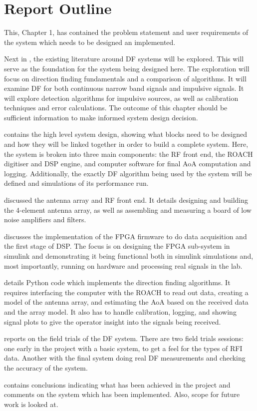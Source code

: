 \section{Report Outline}
This, Chapter 1, has contained the problem statement and user requirements of the system which needs to be designed an implemented. 

Next in , the existing literature around DF systems will be explored. This will serve as the foundation for the system being designed here. The exploration will focus on direction finding fundamentals and a comparison of algorithms. It will examine DF for both continuous narrow band signals and impulsive signals. It will explore detection algorithms for impulsive sources, as well as calibration techniques and error calculations. The outcome of this chapter should be sufficient information to make informed system design decision.

 contains the high level system design, showing what blocks need to be designed and how they will be linked together in order to build a complete system. Here, the system is broken into three main components: the RF front end, the ROACH digitiser and DSP engine, and computer software for final AoA computation and logging. Additionally, the exactly DF algorithm being used by the system will be defined and simulations of its performance run.

 discussed the antenna array and RF front end. It details designing and building the 4-element antenna array, as well as assembling and measuring a board of low noise amplifiers and filters.

 discusses the implementation of the FPGA firmware to do data acquisition and the first stage of DSP. The focus is on designing the FPGA sub-system in simulink and demonstrating it being functional both in simulink simulations and, most importantly, running on hardware and processing real signals in the lab.

 details Python code which implements the direction finding algorithms. It requires interfacing the computer with the ROACH to read out data, creating a model of the antenna array, and estimating the AoA based on the received data and the array model. It also has to handle calibration, logging, and showing signal plots to give the operator insight into the signals being received.

 reports on the field trials of the DF system. There are two field trials sessions: one early in the project with a basic system, to get a feel for the types of RFI data. Another with the final system doing real DF measurements and checking the accuracy of the system.

 contains conclusions indicating what has been achieved in the project and comments on the system which has been implemented. Also, scope for future work is looked at.
